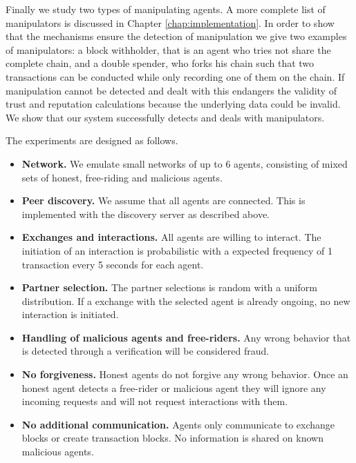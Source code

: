 Finally we study two types of manipulating agents. A more complete list of manipulators is discussed
in Chapter \ref{chap:implementation}. In order to show that the mechanisms ensure the detection of 
manipulation we give two examples of manipulators: a block withholder, that is an agent who tries not 
share the complete chain, and a double spender, who forks his chain such that two transactions can 
be conducted while only recording one of them on the chain. If manipulation cannot be detected and
dealt with this endangers the validity of trust and reputation calculations because the underlying 
data could be invalid. We show that our system successfully detects and deals with manipulators.


The experiments are designed as follows.

\begin{itemize}
  \item \textbf{Network.} We emulate small networks of up to 6 agents, consisting of mixed sets of honest, free-riding and 
  malicious agents.
  \item \textbf{Peer discovery.} We assume that all agents are connected. This is implemented with the discovery server as described 
  above. 
  \item \textbf{Exchanges and interactions.} All agents are willing to interact. The initiation of an
  interaction is probabilistic with a expected frequency of 1 transaction every 5 seconds for each agent. 
  \item \textbf{Partner selection.} The partner selections is random with a uniform distribution. If 
  a exchange with the selected agent is already ongoing, no new interaction is initiated.
  \item \textbf{Handling of malicious agents and free-riders.} Any wrong behavior that is detected
  through a verification will be considered fraud. 
  \item \textbf{No forgiveness.} Honest agents do not forgive any wrong behavior.
  Once an honest agent detects a free-rider or malicious agent they will ignore any incoming requests
  and will not request interactions with them. 
  \item \textbf{No additional communication.} Agents only communicate to exchange blocks or create 
  transaction blocks. No information is shared on known malicious agents.
\end{itemize}


